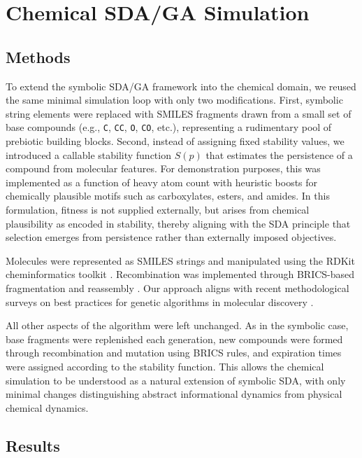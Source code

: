 \documentclass[life,article,submit,pdftex,moreauthors]{Definitions/mdpi}
\begin{document}
\section{Chemical SDA/GA Simulation}

\subsection{Methods}

To extend the symbolic SDA/GA framework into the chemical domain, we reused the same minimal simulation loop with only two modifications. First, symbolic string elements were replaced with SMILES fragments drawn from a small set of base compounds (e.g., \texttt{C}, \texttt{CC}, \texttt{O}, \texttt{CO}, etc.), representing a rudimentary pool of prebiotic building blocks. Second, instead of assigning fixed stability values, we introduced a callable stability function $S(p)$ that estimates the persistence of a compound from molecular features. For demonstration purposes, this was implemented as a function of heavy atom count with heuristic boosts for chemically plausible motifs such as carboxylates, esters, and amides. In this formulation, fitness is not supplied externally, but arises from chemical plausibility as encoded in stability, thereby aligning with the SDA principle that selection emerges from persistence rather than externally imposed objectives.  

Molecules were represented as SMILES strings and manipulated using the RDKit cheminformatics toolkit \cite{landrum2006rdkit}. Recombination was implemented through BRICS-based fragmentation and reassembly \cite{degen2008art}. Our approach aligns with recent methodological surveys on best practices for genetic algorithms in molecular discovery \cite{janet2023bestpractices}.

All other aspects of the algorithm were left unchanged. As in the symbolic case, base fragments were replenished each generation, new compounds were formed through recombination and mutation using BRICS rules, and expiration times were assigned according to the stability function. This allows the chemical simulation to be understood as a natural extension of symbolic SDA, with only minimal changes distinguishing abstract informational dynamics from physical chemical dynamics.  

\subsection{Results}
\end{document}
